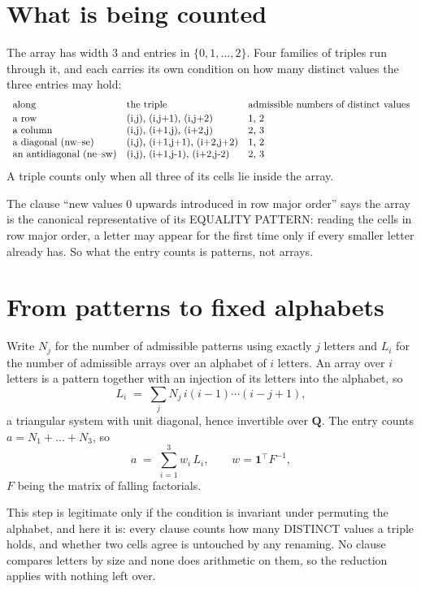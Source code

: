 \documentclass[11pt,a4paper]{article}
\theoremstyle{plain}
\theoremstyle{definition}
\begin{document}
\section{What is being counted}

The array has width $3$ and entries in $\{0,1,\dots,2\}$. Four families of triples
run through it, and each carries its own condition on how many distinct values the three
entries may hold:
\[
\begin{array}{lll}
\text{along} & \text{the triple} & \text{admissible numbers of distinct values} \\[2pt]
\text{a row} & $(i,j),\ (i,j+1),\ (i,j+2)$ & $1, 2$ \\
\text{a column} & $(i,j),\ (i+1,j),\ (i+2,j)$ & $2, 3$ \\
\text{a diagonal (nw--se)} & $(i,j),\ (i+1,j+1),\ (i+2,j+2)$ & $1, 2$ \\
\text{an antidiagonal (ne--sw)} & $(i,j),\ (i+1,j-1),\ (i+2,j-2)$ & $2, 3$ \\
\end{array}
\]
A triple counts only when all three of its cells lie inside the array.

The clause ``new values $0$ upwards introduced in row major order'' says the array is the
canonical representative of its EQUALITY PATTERN: reading the cells in row major order, a
letter may appear for the first time only if every smaller letter already has. So what the
entry counts is patterns, not arrays.

\section{From patterns to fixed alphabets}

Write $N_j$ for the number of admissible patterns using exactly $j$ letters and $L_i$ for the
number of admissible arrays over an alphabet of $i$ letters. An array over $i$ letters is a
pattern together with an injection of its letters into the alphabet, so
\[
L_i\;=\;\sum_j N_j\,i(i-1)\cdots(i-j+1),
\]
a triangular system with unit diagonal, hence invertible over $\mathbf{Q}$. The entry counts
$a=N_1+\dots+N_{3}$, so
\[
a\;=\;\sum_{i=1}^{3}w_i\,L_i ,\qquad w=\mathbf{1}^{\!\top}F^{-1},
\]
$F$ being the matrix of falling factorials.

This step is legitimate only if the condition is invariant under permuting the alphabet, and
here it is: every clause counts how many DISTINCT values a triple holds, and whether two cells
agree is untouched by any renaming. No clause compares letters by size and none does arithmetic
on them, so the reduction applies with nothing left over.
\end{document}

